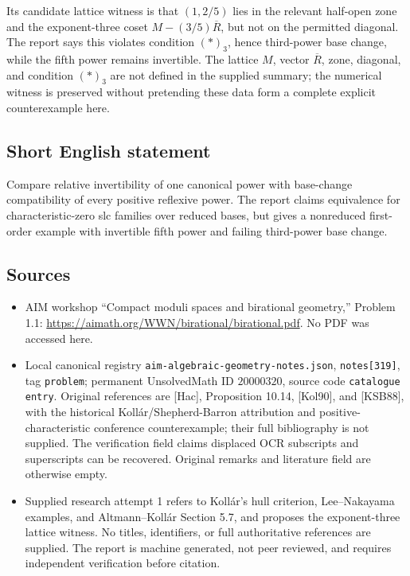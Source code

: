 \documentclass[11pt]{article}
\begin{document}
Its candidate lattice witness is that \((1,2/5)\) lies in the relevant half-open zone and the exponent-three coset \(M-(3/5)\overline R\), but not on the permitted diagonal. The report says this violates condition \((*)_3\), hence third-power base change, while the fifth power remains invertible. The lattice \(M\), vector \(\overline R\), zone, diagonal, and condition \((*)_3\) are not defined in the supplied summary; the numerical witness is preserved without pretending these data form a complete explicit counterexample here.
\subsection{Short English statement}
Compare relative invertibility of one canonical power with base-change compatibility of every positive reflexive power. The report claims equivalence for characteristic-zero slc families over reduced bases, but gives a nonreduced first-order example with invertible fifth power and failing third-power base change.
\subsection{Sources}
\begin{itemize}
\item AIM workshop ``Compact moduli spaces and birational geometry,'' Problem 1.1: \url{https://aimath.org/WWN/birational/birational.pdf}. No PDF was accessed here.
\item Local canonical registry \texttt{aim-algebraic-geometry-notes.json}, \texttt{notes[319]}, tag \texttt{problem}; permanent UnsolvedMath ID \(20000320\), source code \texttt{catalogue entry}. Original references are [Hac], Proposition 10.14, [Kol90], and [KSB88], with the historical Koll\'ar/Shepherd-Barron attribution and positive-characteristic conference counterexample; their full bibliography is not supplied. The verification field claims displaced OCR subscripts and superscripts can be recovered. Original remarks and literature field are otherwise empty.
\item Supplied research attempt 1 refers to Koll\'ar's hull criterion, Lee--Nakayama examples, and Altmann--Koll\'ar Section 5.7, and proposes the exponent-three lattice witness. No titles, identifiers, or full authoritative references are supplied. The report is machine generated, not peer reviewed, and requires independent verification before citation.
\end{itemize}
\end{document}
